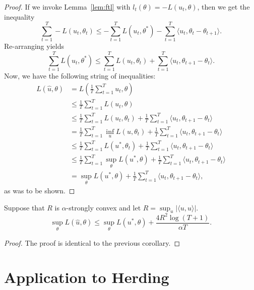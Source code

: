 \documentclass{article}
\begin{document}
\begin{proof}
If we invoke Lemma~\ref{lem:ftl} with $l_t(\theta) = -L(u_t, \theta)$, then we get the inequality
\[ \sum_{t=1}^T -L(u_t, \theta_t) \leq -\sum_{t=1}^T L(u_t, \theta^*) - \sum_{t=1}^T \langle u_t, \theta_t - \theta_{t+1} \rangle. \]
Re-arranging yields
\[ \sum_{t=1}^T L(u_t, \theta^*) \leq \sum_{t=1}^T L(u_t, \theta_t) + \sum_{t=1}^T \langle u_t, \theta_{t+1} - \theta_t \rangle. \]
Now, we have the following string of inequalities:
\begin{align*}
L(\hat{u}, \theta) &= L\left(\frac{1}{T} \sum_{t=1}^T u_t, \theta\right) \\
 &\leq \frac{1}{T} \sum_{t=1}^T L(u_t, \theta) \\
 &\leq \frac{1}{T} \sum_{t=1}^T L(u_t, \theta_t) + \frac{1}{T} \sum_{t=1}^T \langle u_t, \theta_{t+1} - \theta_t \rangle \\
 &= \frac{1}{T} \sum_{t=1}^T \inf_{u} L(u, \theta_t) + \frac{1}{T} \sum_{t=1}^T \langle u_t, \theta_{t+1} - \theta_t \rangle \\
 &\leq \frac{1}{T} \sum_{t=1}^T L(u^*, \theta_t) + \frac{1}{T} \sum_{t=1}^T \langle u_t, \theta_{t+1} - \theta_t \rangle \\
 &\leq \frac{1}{T} \sum_{t=1}^T \sup_{\theta} L(u^*, \theta) + \frac{1}{T} \sum_{t=1}^T \langle u_t, \theta_{t+1} - \theta_t \rangle \\
 &= \sup_{\theta} L(u^*, \theta) + \frac{1}{T} \sum_{t=1}^T \langle u_t, \theta_{t+1} - \theta_t \rangle,
\end{align*}
as was to be shown.
\end{proof}
\begin{corollary}
Suppose that $R$ is $\alpha$-strongly convex and let $R = \sup_{u} |\langle u, u \rangle|$. 
\[ \sup_{\theta} L(\hat{u}, \theta) \leq \sup_{\theta} L(u^*, \theta) + \frac{4R^2\log(T+1)}{\alpha T}. \]
\end{corollary}
\begin{proof}
The proof is identical to the previous corollary.
\end{proof}

\section{Application to Herding}
\label{sec:herding}
\end{document}

